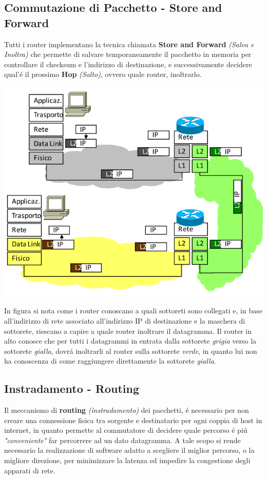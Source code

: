 \documentclass[12pt]{article}
\begin{document}
\subsection{Commutazione di Pacchetto - Store and Forward}\label{router-commutazione-di-pacchetto}
Tutti i router implementano la tecnica chiamata \textbf{Store and Forward} \textit{(Salva e Inoltra)} che permette di 
salvare temporaneamente il pacchetto in memoria per controllare il checksum e l'indirizzo di destinazione, e 
successivamente decidere qual'\'e il prossimo \textbf{Hop} \textit{(Salto)}, ovvero quale router, inoltrarlo.

\begin{center}
	\includegraphics[scale=0.4]{livello_di_rete-img2.png}
\end{center}
In figura si nota come i router conoscano a quali sottoreti sono collegati e, in base all'indirizzo di rete associato 
all'indirizzo IP di destinazione e la maschera di sottorete, riescano a capire a quale router inoltrare il datagramma. Il 
router in alto conosce che per tutti i datagrammi in entrata dalla sottorete \textit{grigia} verso la sottorete 
\textit{gialla}, dovr\'a inoltrarli al router sulla sottorete \textit{verde}, in quanto lui non ha conoscenza di come 
raggiungere direttamente la sottorete \textit{gialla}.

\clearpage
\subsection{Instradamento - Routing}\label{router-instradamento}
Il meccanismo di \textbf{routing} \textit{(instradamento)} dei pacchetti, \'e necessario per non creare una connessione
fisica tra sorgente e destinatario per ogni coppia di host in internet, in quanto permette al commutatore di decidere 
quale percorso \'e pi\'u \textit{"conveniente"} far percorrere ad un dato datagramma. A tale scopo si rende necessario
la realizzazione di software adatto a scegliere il miglior percorso, o la migliore direzione, per minimizzare la
latenza ed impedire la congestione degli apparati di rete.
\end{document}
